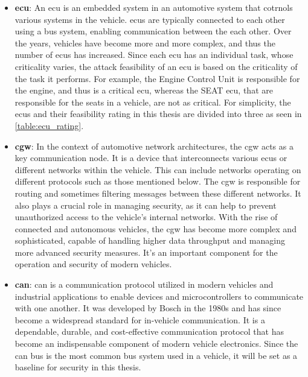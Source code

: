 \begin{itemize}
    \item \textbf{\acrshort{ecu}}: An \acrshort{ecu} is an embedded system in an automotive system that cotrnols various systems in the vehicle.
    \acrshort{ecu}s are typically connected to each other using a bus system, enabling communication between the each other.
    Over the years, vehicles have become more and more complex, and thus the number of \acrshort{ecu}s has increased.
    Since each \acrshort{ecu} has an individual task, whose criticality varies, the attack feasibility of an \acrshort{ecu} is based on the criticality of the task it performs.
    For example, the Engine Control Unit is responsible for the engine, and thus is a critical \acrshort{ecu}, 
    whereas the SEAT \acrshort{ecu}, that are responsible for the seats in a vehicle, are not as critical.
    For simplicity, the \acrshort{ecu}s and their feasibility rating in this thesis are divided into three as seen in \ref{table:ecu_rating}.

    \item \textbf{\acrlong{cgw}}: In the context of automotive network architectures, the \acrshort{cgw} acts as a key communication node. 
    It is a device that interconnects various \acrshort{ecu}s or different networks within the vehicle. 
    This can include networks operating on different protocols such as those mentioned below.
    The \acrshort{cgw} is responsible for routing and sometimes filtering messages between these different networks. 
    It also plays a crucial role in managing security, as it can help to prevent unauthorized access to the vehicle's internal networks.
    With the rise of connected and autonomous vehicles, the \acrshort{cgw} has become more complex and sophisticated, 
    capable of handling higher data throughput and managing more advanced security measures. 
    It's an important component for the operation and security of modern vehicles.
    
    \item \textbf{\acrlong{can}}: \acrshort{can} is a communication protocol utilized in modern vehicles and industrial applications 
    to enable devices and microcontrollers to communicate with one another. 
    It was developed by Bosch in the 1980s and has since become a widespread standard for in-vehicle communication.
    It is a dependable, durable, and cost-effective communication protocol that has become an indispensable component of modern vehicle electronics.
    Since the \acrshort{can} bus is the most common bus system used in a vehicle, it will be set as a baseline for security in this thesis.


\end{itemize}
